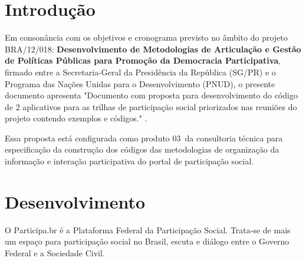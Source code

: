 \documentclass[12pt]{article}
\newcommand{\ProductNumber}{03}
\newcommand{\ProductDescription}{"Documento com proposta para desenvolvimento
        do código de 2 aplicativos para as trilhas de participação social
        priorizados nas reuniões do projeto contendo exemplos e códigos."
}
\newcommand{\PalavrasChave}{palavra1, palavra2, palavra3, etc}
\begin{document}



\tableofcontents
\newpage

\begin{abstract}
The software architecture of a computer program represents the basic structure
and the externally visible relationships of those components. The documentation
of this architecture is of great importance to monitor and evaluate the
evolution of a system and to measure their attributes of modularity as coupling
and cohesion. A tool capable of extracting this documentation automatically
enables monitor and measure these attributes during the evolution of a software
project. This paper presents the implementation of a tool for automatic
extraction of information of dependence between modules for programs written in
C/C++ with focus on attributes of modularity to monitor the evolution of the
system. At the end of this paper is done an evaluation of this
tool through a case study. \\

{\bf Palavras-chave:} \PalavrasChave.
\end{abstract}
\newpage

\section{Introdução}

Em consonância com os objetivos e cronograma previsto no âmbito do
projeto BRA/12/018:
\textbf{Desenvolvimento de Metodologias de Articulação e Gestão de
Políticas Públicas para Promoção da Democracia Participativa},
firmado entre a Secretaria-Geral da Presidência da República
(SG/PR) e o Programa das Nações Unidas para o Desenvolvimento (PNUD),
o presente documento apresenta \ProductDescription.

Essa proposta está configurada como produto \ProductNumber~da consultoria técnica
para especificação da construção dos códigos das metodologias de
organização da informação e interação participativa do portal de
participação social.

\section{Desenvolvimento}

O Participa.br é a Plataforma Federal da Participação Social. Trata-se de mais
um espaço para participação social no Brasil, escuta e diálogo entre o Governo
Federal e a Sociedade Civil. 
\end{document}
